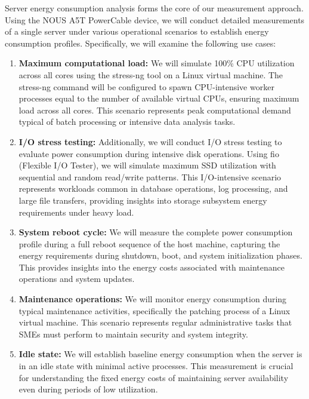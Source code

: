 Server energy consumption analysis forms the core of our measurement approach.
Using the NOUS A5T PowerCable device, we will conduct detailed measurements of a
single server under various operational scenarios to establish energy consumption
profiles. Specifically, we will examine the following use cases:

\begin{enumerate}
    \item \textbf{Maximum computational load:} We will simulate 100\% CPU utilization across all
    cores using the stress-ng tool on a Linux virtual machine. The stress-ng
    command will be configured to spawn CPU-intensive worker processes equal to
    the number of available virtual CPUs, ensuring maximum load across all cores.
    This scenario represents peak computational demand typical of batch processing
    or intensive data analysis tasks. \cite{stressng2020}

    \item \textbf{I/O stress testing:} Additionally, we will conduct I/O stress testing to evaluate
    power consumption during intensive disk operations. Using fio (Flexible I/O Tester),
    we will simulate maximum SSD utilization with sequential and random read/write
    patterns. This I/O-intensive scenario represents workloads common in database operations,
    log processing, and large file transfers, providing insights into storage
    subsystem energy requirements under heavy load.

    \item \textbf{System reboot cycle:} We will measure the complete power consumption profile
    during a full reboot sequence of the host machine, capturing the energy
    requirements during shutdown, boot, and system initialization phases. This
    provides insights into the energy costs associated with maintenance operations
    and system updates.

    \item \textbf{Maintenance operations:} We will monitor energy consumption during typical
    maintenance activities, specifically the patching process of a Linux virtual
    machine. This scenario represents regular administrative tasks that SMEs must
    perform to maintain security and system integrity.

    \item \textbf{Idle state:} We will establish baseline energy consumption when the server is
    in an idle state with minimal active processes. This measurement is crucial
    for understanding the fixed energy costs of maintaining server availability
    even during periods of low utilization. \cite{moran2024dissecting,agilewatts2022}
\end{enumerate}

